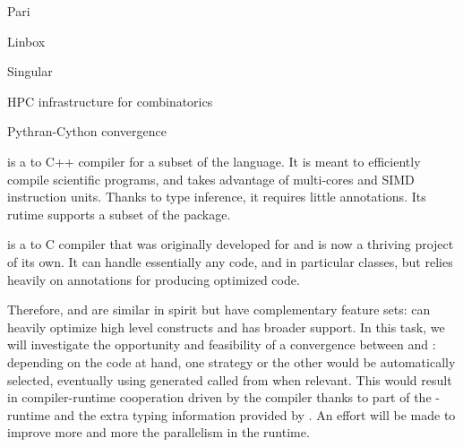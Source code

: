 \begin{Workpackage}{\thewpno}
\begin{WPDescription}
\end{WPDescription}

\begin{task}{Pari}
  \label{task:hpc_pari}

\end{task}

\begin{task}{Linbox}
  \label{task:hpc_linbox}

\end{task}

\begin{task}{Singular}
  \label{task:hpc_singular}

\end{task}


\begin{task}{HPC infrastructure for combinatorics}
\end{task}


\begin{task}{Pythran-Cython convergence}
  \label{task:pythran_cython}

  \Pythran is a \Python to C++ compiler for a subset of the \Python
  language. It is meant to efficiently compile scientific programs,
  and takes advantage of multi-cores and SIMD instruction units.
  Thanks to type inference, it requires little annotations. Its rutime
  supports a subset of the \Numpy package.

  \Cython is a \Python to C compiler that was originally developed for
  \Sage and is now a thriving project of its own. It can handle
  essentially any \Python code, and in particular classes, but relies
  heavily on annotations for producing optimized code.

  Therefore, \Pythran and \Cython are similar in spirit but have
  complementary feature sets: \Pythran can heavily optimize high level
  \Numpy constructs and \Cython has broader \Python support. In this
  task, we will investigate the opportunity and feasibility of a
  convergence between \Cython and \Pythran: depending on the code at
  hand, one strategy or the other would be automatically selected,
  eventually using \Pythran generated called from \Cython when
  relevant. This would result in compiler-runtime cooperation driven
  by the \Cython compiler thanks to part of the \Pythran-runtime and
  the extra typing information provided by \Cython. An effort will be
  made to improve more and more the parallelism in the
  \Pythran runtime.


\end{task}
\end{Workpackage}
